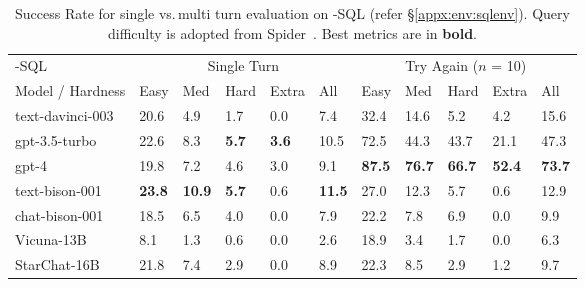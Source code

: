 \begin{table}
\centering
\begin{tabular}{llllll|lllll}
\toprule
      \benchmark{}-SQL & \multicolumn{5}{c}{Single Turn} & \multicolumn{5}{c}{Try Again ($n$ = 10)} \\
     Model / Hardness & Easy & Med & Hard & Extra & All & Easy & Med & Hard & Extra & All \\
\midrule
text-davinci-003 & 20.6 & 4.9 & 1.7 & 0.0 & 7.4 & 32.4 & 14.6 & 5.2 & 4.2 & 15.6 \\
gpt-3.5-turbo & 22.6 & 8.3 & \textbf{5.7} & \textbf{3.6} & 10.5 & 72.5 & 44.3 & 43.7 & 21.1 & 47.3 \\
gpt-4 & 19.8 & 7.2 & 4.6 & 3.0 & 9.1 & \textbf{87.5} & \textbf{76.7} & \textbf{66.7} & \textbf{52.4} & \textbf{73.7} \\
text-bison-001 & \textbf{23.8} & \textbf{10.9} & \textbf{5.7} & 0.6 & \textbf{11.5} & 27.0 & 12.3 & 5.7 & 0.6 & 12.9 \\
chat-bison-001 & 18.5 & 6.5 & 4.0 & 0.0 & 7.9 & 22.2 & 7.8 & 6.9 & 0.0 & 9.9 \\
Vicuna-13B & 8.1 & 1.3 & 0.6 & 0.0 & 2.6 & 18.9 & 3.4 & 1.7 & 0.0 & 6.3 \\
StarChat-16B & 21.8 & 7.4 & 2.9 & 0.0 & 8.9 & 22.3 & 8.5 & 2.9 & 1.2 & 9.7 \\
\bottomrule
\end{tabular}
\vspace{5pt}
\caption{Success Rate for single vs.\,multi turn evaluation on \benchmark{}-SQL (refer \S\ref{appx:env:sqlenv}). Query difficulty is adopted from Spider~\cite{yu-etal-2018-spider}. Best metrics are in \textbf{bold}.}
\label{table:single-vs-multi-sql}
\vspace{-10pt}
\end{table}
